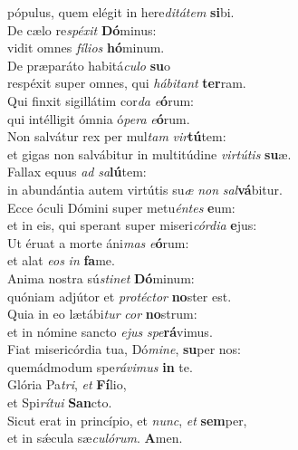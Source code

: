 \evenverse pópulus, quem elégit in here\textit{di}\textit{tá}\textit{tem} \textbf{si}bi.\\
\oddverse De cælo re\textit{spé}\textit{xit} \textbf{Dó}minus:~\*\\
\oddverse vidit omnes \textit{fí}\textit{li}\textit{os} \textbf{hó}minum.\\
\evenverse De præparáto habitá\textit{cu}\textit{lo} \textbf{su}o~\*\\
\evenverse respéxit super omnes, qui \textit{há}\textit{bi}\textit{tant} \textbf{ter}ram.\\
\oddverse Qui finxit sigillátim cor\textit{da} \textit{e}\textbf{ó}rum:~\*\\
\oddverse qui intélligit ómnia ó\textit{pe}\textit{ra} \textit{e}\textbf{ó}rum.\\
\evenverse Non salvátur rex per mul\textit{tam} \textit{vir}\textbf{tú}tem:~\*\\
\evenverse et gigas non salvábitur in multitúdine \textit{vir}\textit{tú}\textit{tis} \textbf{su}æ.\\
\oddverse Fallax equus \textit{ad} \textit{sa}\textbf{lú}tem:~\*\\
\oddverse in abundántia autem virtútis su\textit{æ} \textit{non} \textit{sal}\textbf{vá}bitur.\\
\evenverse Ecce óculi Dómini super metu\textit{én}\textit{tes} \textbf{e}um:~\*\\
\evenverse et in eis, qui sperant super miseri\textit{cór}\textit{di}\textit{a} \textbf{e}jus:\\
\oddverse Ut éruat a morte áni\textit{mas} \textit{e}\textbf{ó}rum:~\*\\
\oddverse et alat \textit{e}\textit{os} \textit{in} \textbf{fa}me.\\
\evenverse Anima nostra sú\textit{sti}\textit{net} \textbf{Dó}minum:~\*\\
\evenverse quóniam adjútor et \textit{pro}\textit{té}\textit{ctor} \textbf{no}ster est.\\
\oddverse Quia in eo lætábi\textit{tur} \textit{cor} \textbf{no}strum:~\*\\
\oddverse et in nómine sancto \textit{e}\textit{jus} \textit{spe}\textbf{rá}vimus.\\
\evenverse Fiat misericórdia tua, Dó\textit{mi}\textit{ne}, \textbf{su}per nos:~\*\\
\evenverse quemádmodum spe\textit{rá}\textit{vi}\textit{mus} \textbf{in} te.\\
\oddverse Glória Pa\textit{tri}, \textit{et} \textbf{Fí}lio,~\*\\
\oddverse et Spi\textit{rí}\textit{tu}\textit{i} \textbf{San}cto.\\
\evenverse Sicut erat in princípio, et \textit{nunc}, \textit{et} \textbf{sem}per,~\*\\
\evenverse et in sǽcula sæ\textit{cu}\textit{ló}\textit{rum}. \textbf{A}men.\\
